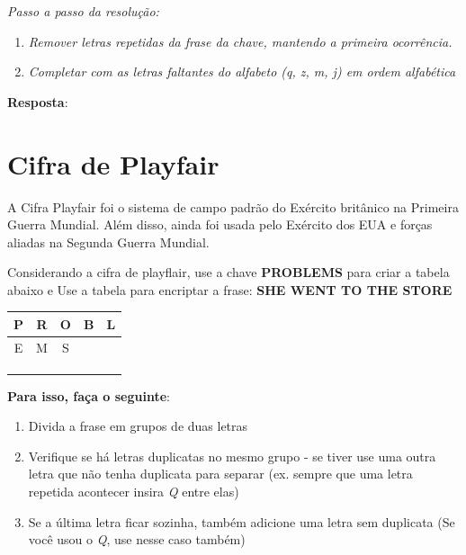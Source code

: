 \textit{Passo a passo da resolução:}
\begin{enumerate}

    \item \textit{Remover letras repetidas da frase da chave, mantendo a primeira ocorrência.}

    \item \textit{Completar com as letras faltantes do alfabeto (q, z, m, j) em ordem alfabética}

       
\end{enumerate}

\textbf{Resposta}:



\section{Cifra de Playfair}

A Cifra Playfair foi o sistema de campo padrão do Exército britânico na Primeira Guerra Mundial. Além disso, ainda foi usada pelo Exército dos EUA e forças aliadas na Segunda Guerra Mundial. 

Considerando a cifra de playflair, use a chave \textbf{PROBLEMS} para criar a tabela abaixo e Use a tabela para encriptar a frase: \textbf{SHE WENT TO THE STORE}




\begin{tabular}{|c|c|c|c|c|}
\hline
P & R & O & B & L \\
\hline
E & M & S &   &   \\
\hline
  &   &   &   &   \\
\hline
  &   &   &   &   \\
\hline
  &   &   &   &   \\
\hline
\end{tabular}




\hspace{1cm}

\textbf{Para isso, faça o seguinte}:
\begin{enumerate}
    \item Divida a frase em grupos de duas letras
    \item Verifique se há letras duplicatas no mesmo grupo - se tiver use uma outra letra que não tenha duplicata para separar (ex. sempre que uma letra repetida acontecer insira \textit{Q} entre elas)
    \item Se a última letra ficar sozinha, também adicione uma letra sem duplicata (Se você usou o \textit{Q}, use nesse caso também)
\end{enumerate}

